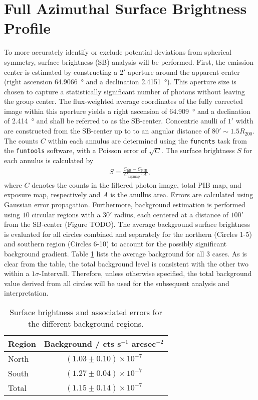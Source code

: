 \section{Full Azimuthal Surface Brightness Profile}\label{sec:full_az}
To more accurately identify or exclude potential deviations from spherical symmetry, surface brightness (SB) analysis will be performed. First, the emission center is estimated by constructing a \(2'\) aperture around the apparent center (right ascension \SI{64.9066}{\degree} and a declination \SI{2.4151}{\degree}). This aperture size is chosen to capture a statistically significant number of photons without leaving the group center. The flux-weighted average coordinates of the fully corrected image within this aperture yields a right ascension of \SI{64.909}{\degree} and a declination of \SI{2.414}{\degree} and shall be referred to as the SB-center. Concentric anulli of \(1'\) width are constructed from the SB-center up to to an angular distance of \(80' \sim 1.5R_{200}\). The counts \(C\) within each annulus are determined using the \texttt{funcnts} task from the \texttt{funtools} software, with a Poisson error of \(\sqrt{C}\). The surface brightness \(S\) for each annulus is calculated by
\begin{align*}
    S = \frac{C_\text{filt} - C_\text{PIB}}{C_\text{expmap}\cdot A},
\end{align*}
where \(C\) denotes the counts in the filtered photon image, total PIB map, and exposure map, respectively and \(A\) is the anullus area. Errors are calculated using Gaussian error propagation. Furthermore, background estimation is performed using \(10\) circular regions with a \(30'\) radius, each centered at a distance of \(100'\) from the SB-center (Figure TODO). The average background surface brightness is evaluated for all circles combined and separately for the northern (Circles 1-5) and southern region (Circles 6-10) to account for the possibly significant background gradient. Table \ref{tab:background} lists the average background for all 3 cases. As is clear from the table, the total background level is consistent with the other two within a \(1\sigma\)-Intervall. Therefore, unless otherwise specified, the total background value derived from all circles will be used for the subsequent analysis and interpretation.
%
\begin{table}[htbp]
    \centering
    \begin{tabular}{l c}
    \toprule
    Region & Background / cts s$^{-1}$ arcsec$^{-2}$ \\
    \midrule
    North & $(1.03 \pm 0.10) \times 10^{-7}$ \\
    South & $(1.27 \pm 0.04) \times 10^{-7}$ \\
    Total & $(1.15 \pm 0.14) \times 10^{-7}$ \\
    \bottomrule
    \end{tabular}
    \caption{Surface brightness and associated errors for the different background regions.}
    \label{tab:background}
\end{table}
